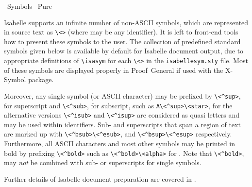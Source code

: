 %
\begin{isabellebody}%
\def\isabellecontext{Symbols}%
%
\isadelimtheory
%
\endisadelimtheory
%
\isatagtheory
{}\isamarkupfalse%
\ Symbols\isanewline
{}\ Pure\isanewline
{}%
\endisatagtheory
{\isafoldtheory}%
%
\isadelimtheory
%
\endisadelimtheory
%
\isamarkuptrue%
%
\begin{isamarkuptext}%
Isabelle supports an infinite number of non-ASCII symbols, which are
  represented in source text as \verb|\|\verb|<|\verb|>| (where  may be any identifier).  It
  is left to front-end tools how to present these symbols to the user.
  The collection of predefined standard symbols given below is
  available by default for Isabelle document output, due to
  appropriate definitions of \verb|\|\verb|isasym| for each \verb|\|\verb|<|\verb|>| in the \verb|isabellesym.sty| file.  Most of these symbols
  are displayed properly in Proof~General if used with the X-Symbol
  package.

  Moreover, any single symbol (or ASCII character) may be prefixed by
  \verb|\|\verb|<^sup>|, for superscript and \verb|\|\verb|<^sub>|, for subscript, such as \verb|A\|\verb|<^sup>\<star>|, for  the alternative
  versions \verb|\|\verb|<^isub>| and \verb|\|\verb|<^isup>| are considered as quasi letters and may
  be used within identifiers.  Sub- and superscripts that span a
  region of text are marked up with \verb|\|\verb|<^bsub>|\verb|\|\verb|<^esub>|, and
  \verb|\|\verb|<^bsup>|\verb|\|\verb|<^esup>| respectively.  Furthermore, all ASCII
  characters and most other symbols may be printed in bold by
  prefixing \verb|\|\verb|<^bold>| such as \verb|\|\verb|<^bold>\|\verb|<alpha>| for .  Note that \verb|\|\verb|<^bold>|, may
  \emph{not} be combined with sub- or superscripts for single symbols.

  Further details of Isabelle document preparation are covered in
  .

  \begin{center}
  \begin{isabellebody}
    
  \end{isabellebody}
  \end{center}%
\end{isamarkuptext}%
\isamarkuptrue%
%
\isadelimtheory
%
\endisadelimtheory
%
\isatagtheory
{}\isamarkupfalse%
%
\endisatagtheory
{\isafoldtheory}%
%
\isadelimtheory
%
\endisadelimtheory
\end{isabellebody}%
